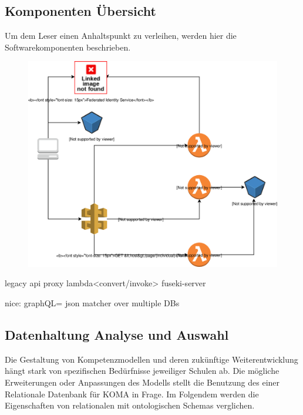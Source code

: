 \documentclass[
12pt,
english,
ngerman,
headsepline,
twoside,
openright,
numbers=noenddot,version=first
]{scrreprt}
\begin{document}
\subsection{Komponenten Übersicht}
\label{sec:components}
Um dem Leser einen Anhaltspunkt zu verleihen, werden hier die Softwarekomponenten beschrieben.

\begin{figure}[H]
	\includegraphics[width=\linewidth]{./pics/static-web-hosting.eps}
\end{figure}

legacy api proxy\cite{serverlessArchAWS}
lambda<convert/invoke> fuseki-server\label{komponenten:fuseki}

nice: graphQL= json matcher over multiple DBs




\subsection{Datenhaltung Analyse und Auswahl}

Die Gestaltung von Kompetenzmodellen und deren zukünftige Weiterentwicklung hängt stark von spezifischen Bedürfnisse jeweiliger Schulen ab. Die mögliche Erweiterungen oder Anpassungen des Modells stellt die Benutzung des einer Relationale Datenbank für \acrshort{KOMA} in Frage. Im Folgendem werden die Eigenschaften von relationalen mit ontologischen Schemas verglichen.
\end{document}
